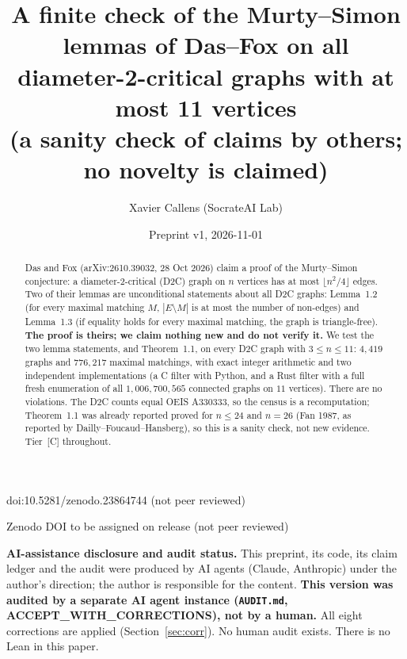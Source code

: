 \documentclass[10pt]{article}
\title{A finite check of the Murty--Simon lemmas of Das--Fox on all diameter-2-critical graphs with at most 11 vertices\\
{\large (a sanity check of claims by others; no novelty is claimed)}}
\author{Xavier Callens (SocrateAI Lab)}
\date{Preprint v1, 2026-11-01}
\newcommand{\tier}[1]{\textsf{[#1]}}
\newcommand{\tC}{\tier{C}}
\begin{document}
\maketitle
\begin{center}\small doi:10.5281/zenodo.23864744 \quad (not peer reviewed)\end{center}

\begin{center}\small Zenodo DOI to be assigned on release \quad (not peer reviewed)\end{center}

\noindent\textbf{AI-assistance disclosure and audit status.} This preprint, its code, its claim ledger and the audit were produced by AI agents (Claude, Anthropic) under the author's direction; the author is responsible for the content.
\textbf{This version was audited by a separate AI agent instance (\texttt{AUDIT.md}, ACCEPT\_WITH\_CORRECTIONS), not by a human.} All eight corrections are applied (Section~\ref{sec:corr}). No human audit exists. There is no Lean in this paper.

\begin{abstract}
\noindent Das and Fox (arXiv:2610.39032, 28 Oct 2026) claim a proof of the Murty--Simon conjecture: a diameter-2-critical (D2C) graph on $n$ vertices has at most $\lfloor n^2/4\rfloor$ edges. Two of their lemmas are unconditional statements about all D2C graphs: Lemma~1.2 (for every maximal matching $M$, $|E\setminus M|$ is at most the number of non-edges) and Lemma~1.3 (if equality holds for every maximal matching, the graph is triangle-free). \textbf{The proof is theirs; we claim nothing new and do not verify it.} We test the two lemma statements, and Theorem~1.1, on every D2C graph with $3\le n\le 11$: $4{,}419$ graphs and $776{,}217$ maximal matchings, with exact integer arithmetic and two independent implementations (a C filter with Python, and a Rust filter with a full fresh enumeration of all $1{,}006{,}700{,}565$ connected graphs on $11$ vertices). There are no violations. The D2C counts equal OEIS A330333, so the census is a recomputation; Theorem~1.1 was already reported proved for $n\le 24$ and $n=26$ (Fan 1987, as reported by Dailly--Foucaud--Hansberg), so this is a sanity check, not new evidence. Tier~\tC{} throughout.
\end{abstract}

\noindent{}
\end{document}
